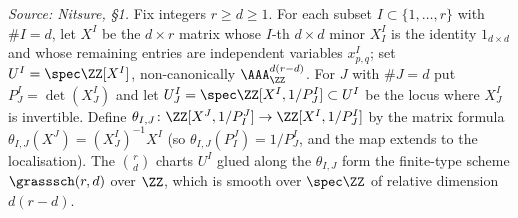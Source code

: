 \begin{definition}
  \label{def:grassmannian-scheme}
  \textit{Source: Nitsure, §1.}
  Fix integers $r\ge d\ge 1$. For each subset $I\subset\{1,\dots,r\}$ with
  $\#I = d$, let $X^I$ be the $d\times r$ matrix whose $I$-th $d\times d$ minor
  $X^I_I$ is the identity $1_{d\times d}$ and whose remaining entries are
  independent variables $x^I_{p,q}$; set $U^I = \spec\ZZ[X^I]$, non-canonically
  $\AAA^{d(r-d)}_{\ZZ}$. For $J$ with $\#J = d$ put $P^I_J = \det(X^I_J)$ and let
  $U^I_J = \spec\ZZ[X^I, 1/P^I_J]\subset U^I$ be the locus where $X^I_J$ is
  invertible. Define $\theta_{I,J}\colon\ZZ[X^J,1/P^J_I]\to\ZZ[X^I,1/P^I_J]$ by
  the matrix formula $\theta_{I,J}(X^J) = (X^I_J)^{-1}X^I$ (so
  $\theta_{I,J}(P^J_I) = 1/P^I_J$, and the map extends to the localisation). The
  $\binom{r}{d}$ charts $U^I$ glued along the $\theta_{I,J}$ form the
  finite-type scheme $\grasssch(r,d)$ over $\ZZ$, which is smooth over $\spec\ZZ$
  of relative dimension $d(r-d)$.


\end{definition}
